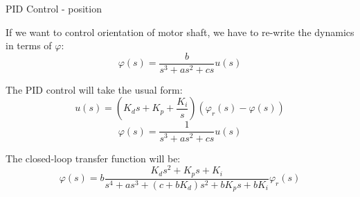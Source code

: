 \documentclass{beamer}
\begin{document}
\begin{frame}{PID Control - position}
	\begin{flushleft}
		
	If we want to control orientation of motor shaft, we have to re-write the dynamics in terms of $\varphi$:
	\begin{equation}
		\varphi(s) = \frac{b}{s^3 + a s^2 + cs} u(s)
	\end{equation}
		
	The PID control will take the usual form:
	\begin{equation}
		u(s) =  (K_d s + K_p + \frac{K_i}{s}) (\varphi_r(s) - \varphi(s))
	\end{equation}
	\begin{equation}
		\varphi(s) = \frac{1}{s^3 + a s^2 + cs} u(s)
	\end{equation}

	The closed-loop transfer function will be:
	\begin{equation}
		\varphi(s) = b\frac{K_d s^2 + K_ps + K_i}{s^4 + a s^3 + (c+bK_d)s^2 + bK_p s + bK_i} \varphi_r(s)
	\end{equation}
	
		
	\end{flushleft}
\end{frame}


\myqrframe
\end{document}
